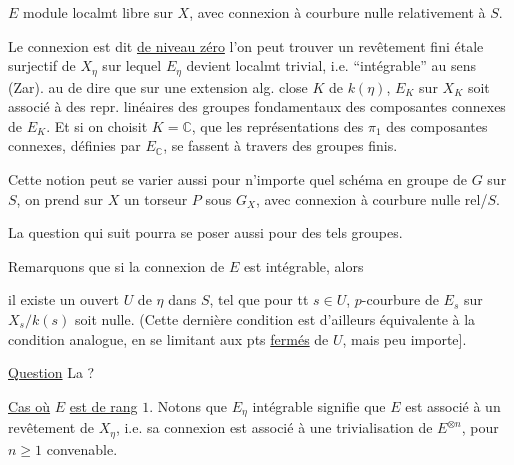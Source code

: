 $E$ module localmt libre sur $X$, avec connexion à courbure nulle relativement à $S$.

Le  connexion  est dit \uline{de niveau zéro}   l'on peut trouver un revêtement fini étale surjectif de $X_{\eta}$ sur lequel $E_{\eta}$ devient localmt trivial, i.e. ``intégrable'' au sens (Zar).   au \unsure{$\simeq$|$=$} de dire que sur une extension alg. close  $K$ de $k(\eta)$, $E_K$ sur $X_K$ soit associé à des repr. linéaires des groupes fondamentaux des composantes connexes de $E_K$. Et si on choisit $K=\mathbb C$, que les représentations des $\pi_1$  des composantes  connexes, définies par $E_{\mathbb C}$,  se fassent à travers des groupes finis.



Cette notion peut se varier aussi pour n'importe quel schéma en groupe de  $G$ sur $S$, on prend sur $X$ un torseur $P$ sous $G_X$, avec connexion à courbure nulle rel/$S$.

La question qui suit pourra se poser aussi pour des tels groupes.

Remarquons que si la connexion de $E$ est intégrable, alors


il existe un  ouvert  $U$  de $\eta$ dans $S$, tel que pour tt $s\in U$,   $p$-courbure de $E_s$ sur $X_s/k(s)$ soit nulle.  (Cette dernière condition est d'ailleurs équivalente à la condition analogue,  en se limitant aux pts \uline{fermés} de $U$, mais peu importe].

\uline{Question} La  ?

\uline{Cas  où} $E$ \uline{est de rang} $1$. Notons que  $E_{\eta}$ intégrable signifie que $E$ est associé à un revêtement  de $X_{\eta}$, i.e.  sa connexion est associé à une trivialisation de $E^{\otimes n}$, pour $n\geq1$ convenable.

